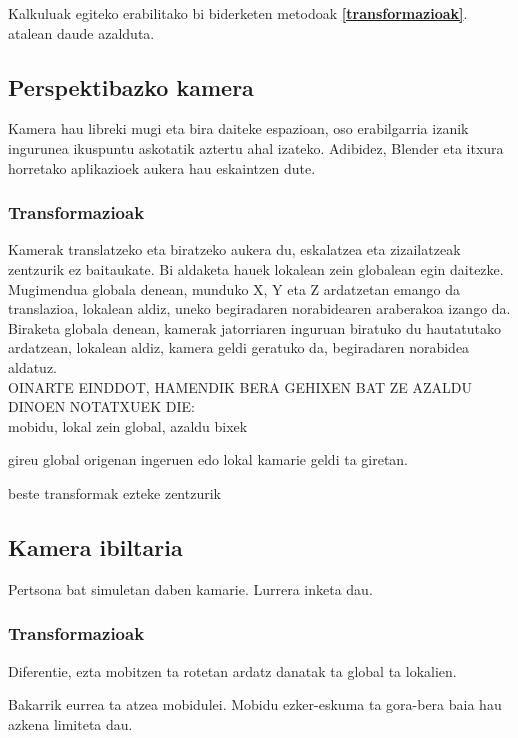 \documentclass[12pt]{article}
\newcommand{\erref}[1] {\textbf{\ref{#1}}}
\begin{document}
Kalkuluak egiteko erabilitako bi biderketen metodoak \erref{transformazioak}. atalean daude azalduta.


\subsection{Perspektibazko kamera}

Kamera hau libreki mugi eta bira daiteke espazioan, oso erabilgarria izanik ingurunea ikuspuntu askotatik aztertu ahal izateko. Adibidez, Blender\cite{blender} eta itxura horretako aplikazioek aukera hau eskaintzen dute.

\subsubsection{Transformazioak}

Kamerak translatzeko eta biratzeko aukera du, eskalatzea eta zizailatzeak zentzurik ez baitaukate. Bi aldaketa hauek lokalean zein globalean egin daitezke. Mugimendua globala denean, munduko X, Y eta Z ardatzetan emango da translazioa, lokalean aldiz, uneko begiradaren norabidearen araberakoa izango da. Biraketa globala denean, kamerak jatorriaren inguruan biratuko du hautatutako ardatzean, lokalean aldiz, kamera geldi geratuko da, begiradaren norabidea aldatuz.\\

OINARTE EINDDOT, HAMENDIK BERA GEHIXEN BAT ZE AZALDU DINOEN NOTATXUEK DIE:\\

mobidu, lokal zein global, azaldu bixek

gireu global origenan ingeruen edo lokal kamarie geldi ta giretan.

beste transformak ezteke zentzurik

\subsection{Kamera ibiltaria}

Pertsona bat simuletan daben kamarie. Lurrera inketa dau.

\subsubsection{Transformazioak}

Diferentie, ezta mobitzen ta rotetan ardatz danatak ta global ta lokalien.

Bakarrik eurrea ta atzea mobidulei. Mobidu ezker-eskuma ta gora-bera baia hau azkena limiteta dau.
\end{document}
